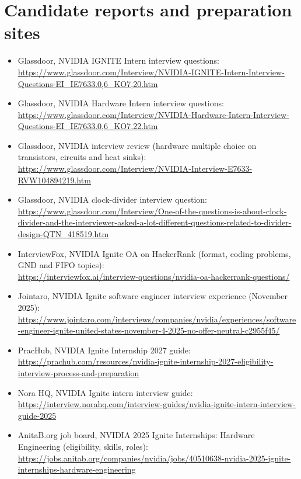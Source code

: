 \section*{Candidate reports and preparation sites}
\begin{itemize}\small
  \item Glassdoor, NVIDIA IGNITE Intern interview questions:\\ \url{https://www.glassdoor.com/Interview/NVIDIA-IGNITE-Intern-Interview-Questions-EI_IE7633.0,6_KO7,20.htm}
  \item Glassdoor, NVIDIA Hardware Intern interview questions:\\ \url{https://www.glassdoor.com/Interview/NVIDIA-Hardware-Intern-Interview-Questions-EI_IE7633.0,6_KO7,22.htm}
  \item Glassdoor, NVIDIA interview review (hardware multiple choice on transistors, circuits and heat sinks):\\ \url{https://www.glassdoor.com/Interview/NVIDIA-Interview-E7633-RVW104894219.htm}
  \item Glassdoor, NVIDIA clock-divider interview question:\\ \url{https://www.glassdoor.com/Interview/One-of-the-questions-is-about-clock-divider-and-the-interviewer-asked-a-lot-different-questions-related-to-divider-design-QTN_418519.htm}
  \item InterviewFox, NVIDIA Ignite OA on HackerRank (format, coding problems, GND and FIFO topics):\\ \url{https://interviewfox.ai/interview-questions/nvidia-oa-hackerrank-questions/}
  \item Jointaro, NVIDIA Ignite software engineer interview experience (November 2025):\\ \url{https://www.jointaro.com/interviews/companies/nvidia/experiences/software-engineer-ignite-united-states-november-4-2025-no-offer-neutral-c2955f45/}
  \item PracHub, NVIDIA Ignite Internship 2027 guide:\\ \url{https://prachub.com/resources/nvidia-ignite-internship-2027-eligibility-interview-process-and-preparation}
  \item Nora HQ, NVIDIA Ignite intern interview guide:\\ \url{https://interview.norahq.com/interview-guides/nvidia-ignite-intern-interview-guide-2025}
  \item AnitaB.org job board, NVIDIA 2025 Ignite Internships: Hardware Engineering (eligibility, skills, roles):\\ \url{https://jobs.anitab.org/companies/nvidia/jobs/40510638-nvidia-2025-ignite-internships-hardware-engineering}

\end{itemize}
